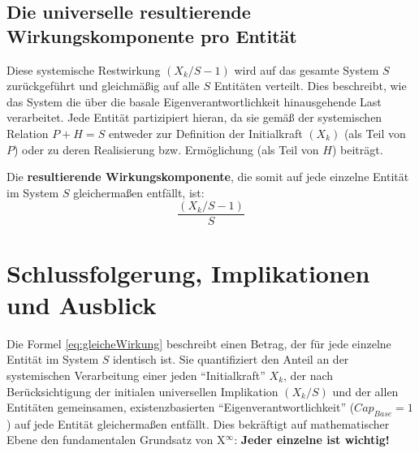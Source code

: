 \documentclass[12pt]{scrartcl}
\begin{document}
\subsection{Die universelle resultierende Wirkungskomponente pro Entität}
Diese systemische Restwirkung $(X_k/S - 1)$ wird auf das gesamte System $S$ zurückgeführt und gleichmäßig auf alle $S$ Entitäten verteilt. Dies beschreibt, wie das System die über die basale Eigenverantwortlichkeit hinausgehende Last verarbeitet. Jede Entität partizipiert hieran, da sie gemäß der systemischen Relation $P+H=S$ entweder zur Definition der Initialkraft $(X_k)$ (als Teil von $P$) oder zu deren Realisierung bzw. Ermöglichung (als Teil von $H$) beiträgt.

Die \textbf{resultierende Wirkungskomponente}, die somit auf jede einzelne Entität im System $S$ gleichermaßen entfällt, ist:
\begin{equation} \label{eq:gleicheWirkung}
\frac{(X_k/S - 1)}{S}
\end{equation}

\section{Schlussfolgerung, Implikationen und Ausblick}
Die Formel \eqref{eq:gleicheWirkung} beschreibt einen Betrag, der für jede einzelne Entität im System $S$ identisch ist. Sie quantifiziert den Anteil an der systemischen Verarbeitung einer jeden \enquote{Initialkraft} $X_k$, der nach Berücksichtigung der initialen universellen Implikation $(X_k/S)$ und der allen Entitäten gemeinsamen, existenzbasierten \enquote{Eigenverantwortlichkeit} ($Cap_{Base}=1$) auf jede Entität gleichermaßen entfällt. Dies bekräftigt auf mathematischer Ebene den fundamentalen Grundsatz von X$^\infty$: \textbf{Jeder einzelne ist wichtig!}
\end{document}
